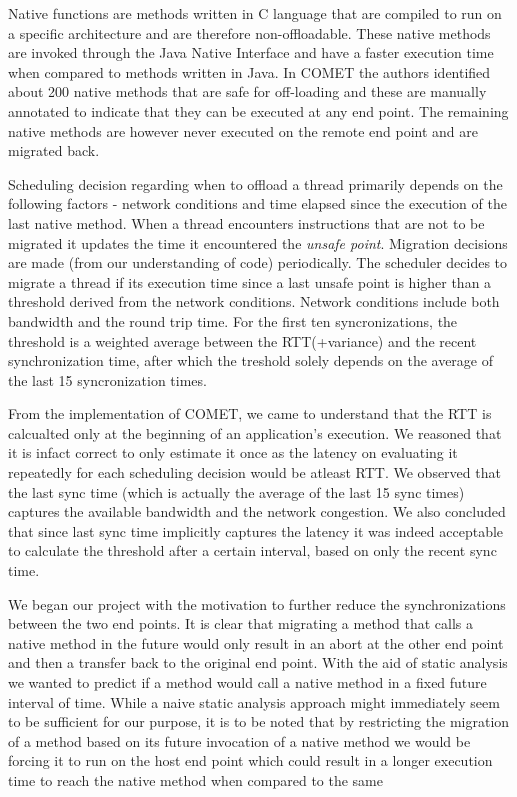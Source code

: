 Native functions are methods written in C language that are compiled to run on a 
specific architecture and are therefore non-offloadable. These native methods
are invoked through the Java Native Interface and have a faster execution time when 
compared to methods written in Java. In COMET the authors identified about 200 
native methods that are safe for off-loading and these are manually annotated to indicate 
that they can be executed at any end point. The remaining native methods are 
however never executed on the remote end point and are migrated back. 

Scheduling decision regarding when to offload a thread primarily depends on the following
factors - network conditions and time elapsed since the execution of the last 
native method. When a thread encounters instructions that are not to be migrated it 
updates the time it encountered the \textit{unsafe point}. Migration decisions are made (from our 
understanding of code) periodically. The scheduler decides to migrate a thread if 
its execution time since a last unsafe point is higher than a threshold 
derived from the network conditions. Network conditions include both bandwidth and the 
round trip time. For the first ten syncronizations, the threshold is a weighted 
average between the RTT(+variance) and the recent synchronization time, after which 
the treshold solely depends on the average of the last 15 syncronization times. 

From the implementation of COMET, we came to understand that the RTT is calcualted 
only at the beginning of an application's execution. We reasoned that it is infact
correct to only estimate it once as the latency on evaluating it repeatedly for 
each scheduling decision would be atleast RTT. We observed that the last sync 
time (which is actually the average of the last 15 sync times) captures the 
available bandwidth and the network congestion. We also concluded that since 
last sync time implicitly captures the latency it was indeed acceptable to 
calculate the threshold after a certain interval, based on only the recent sync time. 

We began our project with the motivation to further reduce the synchronizations 
between the two end points. It is clear that migrating a method that calls a 
native method in the future would only result in an abort at the other end point 
and then a transfer back to the original end point. With the aid of static analysis
we wanted to predict if a method would call a native method in a fixed future interval 
of time. While a naive static analysis approach might immediately seem to be 
sufficient for our purpose, it is to be noted that by restricting the migration of a
method based on its future invocation of a native method we would be forcing it to 
run on the host end point which could result in a longer execution time to reach the 
native method when compared to the same 

